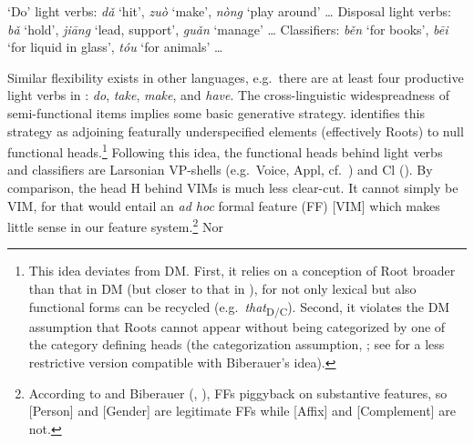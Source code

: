 \documentclass[output=paper]{langsci/langscibook}
\begin{document}
\ea\label{ex:same}
    \ea `Do' light verbs: \textit{d\v{a}} `hit',
        \textit{zu\`{o}} `make', \textit{n\`{o}ng} `play around' \dots{}
    \ex Disposal light verbs: \textit{b\v{a}} `hold', \textit{ji\={a}ng} `lead,
        support', \textit{gu\v{a}n} `manage' \dots{}
    \ex Classifiers: \textit{b\v{e}n} `for books',
        \textit{b\={e}i} `for liquid in glass', \textit{t\'{o}u}
        `for animals' \dots{}
    \z
\z

\noindent Similar flexibility exists in other languages, e.g.\ there are at
least four productive light verbs in : \textit{do}, \textit{take},
\textit{make}, and \textit{have}. The cross-linguistic widespreadness of
semi-functional items implies some basic generative strategy.
\citet[5]{Biberauer2016} identifies this strategy as adjoining featurally
underspecified elements (effectively Roots) to null functional
heads.\footnote{\label{fn5}This idea deviates from \gls{DM}. First, it relies on a
conception of Root broader than that in \gls{DM} (but closer to that in
\citealt{Borer2013}), for not only lexical but also functional forms can be
recycled (e.g.\ \textit{that}\textsubscript{D/C}). Second, it violates the \gls{DM}
assumption that Roots cannot appear without being categorized by one of the
category defining heads (the categorization assumption,
\citealt{EmbickMarantz2008}; see \citealt{Song2017roots} for a less restrictive
version compatible with Biberauer's idea).}
%
%
Following this idea, the functional heads behind light verbs and classifiers
are Larsonian VP-shells (e.g.\ Voice, Appl, cf.\ \citealt{Lohndal2014}) and Cl
(\citealt{Borer2005,Feng2015,Huang2015}). By comparison,
the head H behind \glspl{VIM} is much less clear-cut. It cannot simply be \gls{VIM},
for that would entail an \emph{ad hoc} formal feature (FF) [VIM] which makes little
sense in our feature system.\footnote{\label{fn6}According to
\citet{Zeijlstra2008} and Biberauer (\citeyear{Biberauer2016},
\citeyear{Biberauer2017}), FFs piggyback on substantive features, so [Person]
and [Gender] are legitimate FFs while [Affix] and [Complement] are not.} Nor
\end{document}
